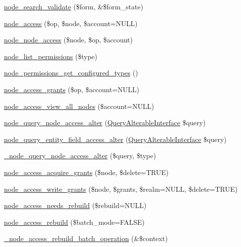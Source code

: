 \begin{DoxyCompactItemize}
\item 
\hyperlink{node_8module_ae3de6c6c7c68a30d51e300264b905930}{node\_\-search\_\-validate} (\$form, \&\$form\_\-state)
\item 
\hyperlink{group__node__access_ga46f0f1ed812befada8f8e7d1b8c352db}{node\_\-access} (\$op, \$node, \$account=NULL)
\item 
\hyperlink{group__node__access_gae826daeafed8b20300a370c2022cc2c1}{node\_\-node\_\-access} (\$node, \$op, \$account)
\item 
\hyperlink{group__node__access_ga929efd16564e3cb073ee5e1ed6c6c2a7}{node\_\-list\_\-permissions} (\$type)
\item 
\hyperlink{group__node__access_ga75960e1cc5852c75c6347ab938938f9b}{node\_\-permissions\_\-get\_\-configured\_\-types} ()
\item 
\hyperlink{group__node__access_gab33de8c23b1edb657f67cb242a8ec8af}{node\_\-access\_\-grants} (\$op, \$account=NULL)
\item 
\hyperlink{group__node__access_gafb79200147d5087ceb32cb6b0632afd4}{node\_\-access\_\-view\_\-all\_\-nodes} (\$account=NULL)
\item 
\hyperlink{group__node__access_gaef7c83544718b8431d81b884ef8cc6f5}{node\_\-query\_\-node\_\-access\_\-alter} (\hyperlink{interfaceQueryAlterableInterface}{QueryAlterableInterface} \$query)
\item 
\hyperlink{group__node__access_gacd4162ac9ee2d2147d5212fd5e7a7319}{node\_\-query\_\-entity\_\-field\_\-access\_\-alter} (\hyperlink{interfaceQueryAlterableInterface}{QueryAlterableInterface} \$query)
\item 
\hyperlink{group__node__access_ga5f4838d9b5cac9f3bee9a26f39e80691}{\_\-node\_\-query\_\-node\_\-access\_\-alter} (\$query, \$type)
\item 
\hyperlink{group__node__access_ga6fbbc13a4098f72663c0a67f81100f67}{node\_\-access\_\-acquire\_\-grants} (\$node, \$delete=TRUE)
\item 
\hyperlink{group__node__access_ga735fbb5dfa05cc1aed121655a1694909}{node\_\-access\_\-write\_\-grants} (\$node, \$grants, \$realm=NULL, \$delete=TRUE)
\item 
\hyperlink{group__node__access_ga895d95595168709334c4eca1472c6d23}{node\_\-access\_\-needs\_\-rebuild} (\$rebuild=NULL)
\item 
\hyperlink{group__node__access_gaf04007aedfc3afbe074b2fe4065ab618}{node\_\-access\_\-rebuild} (\$batch\_\-mode=FALSE)
\item 
\hyperlink{group__node__access_ga2b720b31a5b728b16c357ab995deb5d5}{\_\-node\_\-access\_\-rebuild\_\-batch\_\-operation} (\&\$context)

\end{DoxyCompactItemize}
